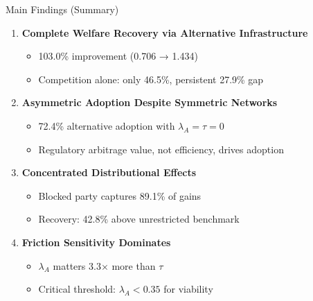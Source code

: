 \documentclass[aspectratio=169]{beamer}
\begin{document}
\begin{frame}{Main Findings (Summary)}
    
    \begin{enumerate}
        \item \textbf{Complete Welfare Recovery via Alternative Infrastructure}
        \begin{itemize}
            \item 103.0\% improvement (0.706 → 1.434)
            \item Competition alone: only 46.5\%, persistent 27.9\% gap
        \end{itemize}
        
        \vspace{0.2cm}
        \item \textbf{Asymmetric Adoption Despite Symmetric Networks}
        \begin{itemize}
            \item 72.4\% alternative adoption with $\lambda_A = \tau = 0$
            \item Regulatory arbitrage value, not efficiency, drives adoption
        \end{itemize}
        
        \vspace{0.2cm}
        \item \textbf{Concentrated Distributional Effects}
        \begin{itemize}
            \item Blocked party captures 89.1\% of gains
            \item Recovery: 42.8\% above unrestricted benchmark
        \end{itemize}
        
        \vspace{0.2cm}
        \item \textbf{Friction Sensitivity Dominates}
        \begin{itemize}
            \item $\lambda_A$ matters 3.3× more than $\tau$
            \item Critical threshold: $\lambda_A < 0.35$ for viability
        \end{itemize}
    \end{enumerate}

\end{frame}
\end{document}
